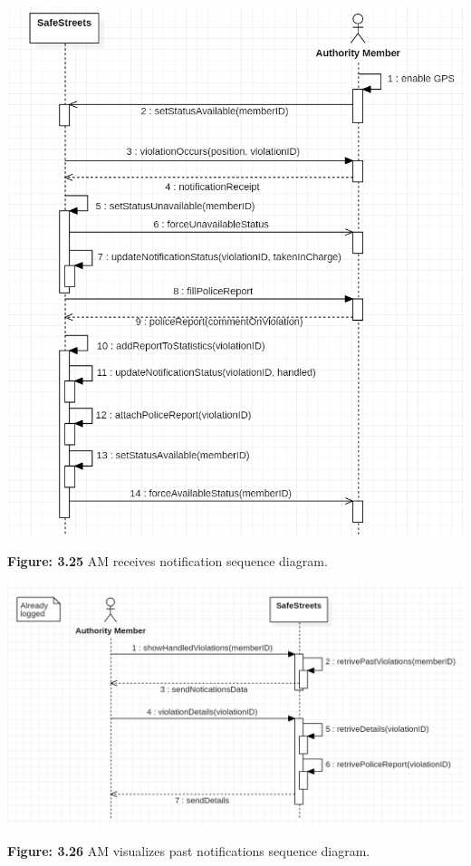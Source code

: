\documentclass[12pt]{article}
\begin{document}
 \includegraphics[scale=0.75]{Sequencediagrams/authorityMmeberRecivesNotification.png}                  
		 
		  \textbf{Figure: 3.25} AM receives notification sequence diagram.

\includegraphics[scale=0.57]{Sequencediagrams/authorityMmeberVisualizePastNotification.png}                  
		 
		  \textbf{Figure: 3.26} AM visualizes past notifications sequence diagram.
		  
\end{document}
